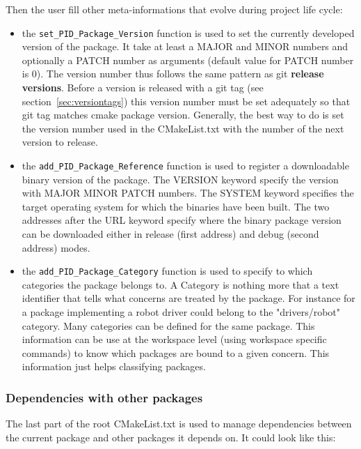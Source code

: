 \documentclass[12pt,a4paper]{article}
\begin{document}
Then the user fill other meta-informations that evolve during project life cycle:
\begin{itemize}
\item the \texttt{set\_PID\_Package\_Version} function is used to set the currently developed version of the package. It take at least a MAJOR and MINOR numbers and optionally a PATCH number as arguments (default value for PATCH number is 0). The version number thus follows the same pattern as git \textbf{release versions}. Before a version is released with a git tag (see section~\ref{sec:versiontags}) this version number must be set adequately so that git tag matches cmake package version. Generally, the best way to do is set the version number used in the CMakeList.txt with the number of the next version to release.
\item the \texttt{add\_PID\_Package\_Reference} function is used to register a downloadable binary version of the package. The VERSION keyword specify the version with MAJOR MINOR PATCH numbers. The SYSTEM keyword specifies the target operating system for which the binaries have been built. The two addresses after the URL keyword specify where the binary package version can be downloaded either in release (first address) and debug (second address) modes.
\item the \texttt{add\_PID\_Package\_Category} function is used to specify to which categories the package belongs to. A Category is nothing more that a text identifier that tells what concerns are treated by the package. For instance for a package implementing a robot driver could belong to the "drivers/robot" category. Many categories can be defined for the same package. This information can be use at the workspace level (using workspace specific commands) to know which packages are bound to a given concern. This information just helps classifying packages.
\end{itemize}

\subsubsection{Dependencies with other packages}
\label{sec:rootCMakeDeps}

The last part of the root CMakeList.txt is used to manage dependencies between the current package and other packages it depends on. It could look like this:
\end{document}

